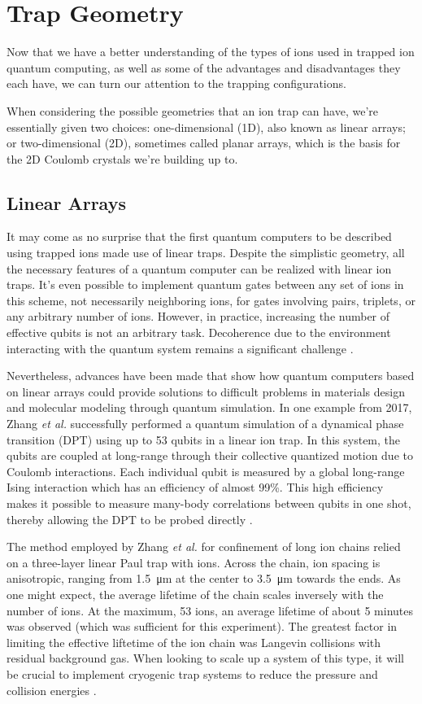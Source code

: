 \section{Trap Geometry}
Now that we have a better understanding of the types of ions used in trapped ion quantum computing, as well as some of the advantages and disadvantages they each have, we can turn our attention to the trapping configurations. 

When considering the possible geometries that an ion trap can have, we're essentially given two choices: one-dimensional (1D), also known as linear arrays; or two-dimensional (2D), sometimes called planar arrays, which is the basis for the 2D Coulomb crystals we're building up to. 

\subsection{Linear Arrays}
It may come as no surprise that the first quantum computers to be described using trapped ions made use of linear traps. Despite the simplistic geometry, all the necessary features of a quantum computer can be realized with linear ion traps. It's even possible to implement quantum gates between any set of ions in this scheme, not necessarily neighboring ions, for gates involving pairs, triplets, or any arbitrary number of ions. However, in practice, increasing the number of effective qubits is not an arbitrary task. Decoherence due to the environment interacting with the quantum system remains a significant challenge \cite{Cirac}.

Nevertheless, advances have been made that show how quantum computers based on linear arrays could provide solutions to difficult problems in materials design and molecular modeling through quantum simulation. In one example from 2017, Zhang \textit{et al.} successfully performed a quantum simulation of a dynamical phase transition (DPT) using up to 53 qubits in a linear ion trap. In this system, the qubits are coupled at long-range through their collective quantized motion due to Coulomb interactions. Each individual qubit is measured by a global long-range Ising interaction which has an efficiency of almost 99\%. This high efficiency makes it possible to measure many-body correlations between qubits in one shot, thereby allowing the DPT to be probed directly \cite{Zhang}.

The method employed by Zhang \textit{et al.} for confinement of long ion chains relied on a three-layer linear Paul trap with  ions. Across the chain, ion spacing is anisotropic, ranging from \SI{1.5}{\micro\meter} at the center to \SI{3.5}{\micro\meter} towards the ends. As one might expect, the average lifetime of the chain scales inversely with the number of ions. At the maximum, 53 ions, an average lifetime of about 5 minutes was observed (which was sufficient for this experiment). The greatest factor in limiting the effective liftetime of the ion chain was Langevin collisions with residual background gas. When looking to scale up a system of this type, it will be crucial to implement cryogenic trap systems to reduce the pressure and collision energies \cite{Zhang}. 

